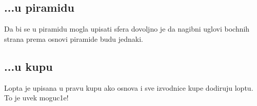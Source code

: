 \documentclass{beamer}
\begin{document}
\subsection{...u piramidu}
\begin{frame}
\begin{block}{}
Da bi se u piramidu mogla upisati sfera dovoljno je da nagibni uglovi bochnih
strana prema osnovi piramide budu jednaki.
\end{block}
\begin{figure}[H]
    
\end{figure}
\end{frame}
\subsection{...u kupu}
\begin{frame}
\begin{block}{}
Lopta je upisana u pravu kupu ako osnova i sve izvodnice kupe dodiruju
loptu. To je uvek moguc1e!  
\end{block}
\begin{figure}[H]
    
\end{figure}
\end{frame}
\end{document}
